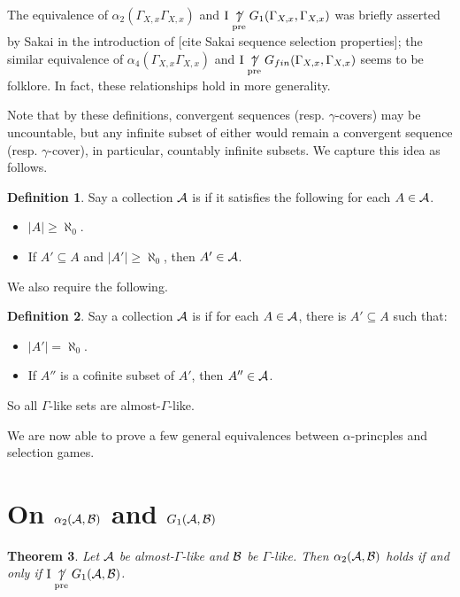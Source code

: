 \documentclass{amsart}
\theoremstyle{plain}
\newtheorem{theorem}{Theorem}
\theoremstyle{definition}
\newtheorem{definition}[theorem]{Definition}
\theoremstyle{remark}
\theoremstyle{plain}
\theoremstyle{definition}
\theoremstyle{remark}
\begin{document}
The equivalence of \(\alpha_2(\Gamma_{X,x}\Gamma_{X,x})\) and 
\(\mathrm{I}\underset{\text{pre}}{\not\uparrow} G_1(\Gamma_{X,x},\Gamma_{X,x})\) was briefly asserted by Sakai
in the introduction of [cite Sakai sequence selection properties]; the similar
equivalence of \(\alpha_4(\Gamma_{X,x}\Gamma_{X,x})\) and 
\(\mathrm{I}\underset{\text{pre}}{\not\uparrow} G_{fin}(\Gamma_{X,x},\Gamma_{X,x})\) seems to be folklore.
In fact, these relationships hold in more generality.

Note that by these definitions, convergent sequences (resp. \(\gamma\)-covers) may be uncountable,
but any infinite subset of either would remain a convergent sequence (resp. \(\gamma\)-cover),
in particular, countably infinite subsets. We capture this idea as follows.

\begin{definition}
Say a collection \(\mathcal{A}\) is  if it satisfies the following
for each \(A\in\mathcal{A}\).
\begin{itemize}
\item \(|A|\geq\aleph_0\).
\item If \(A'\subseteq A\) and \(|A'|\geq\aleph_0\), then \(A'\in\mathcal{A}\).
\end{itemize}
\end{definition}

We also require the following.

\begin{definition}
Say a collection \(\mathcal{A}\) is  if
for each \(A\in\mathcal{A}\), there is \(A'\subseteq A\) such that:
\begin{itemize}
\item \(|A'|=\aleph_0\).
\item If \(A''\) is a cofinite subset of \(A'\), then \(A''\in\mathcal{A}\).
\end{itemize}
\end{definition}

So all \(\Gamma\)-like sets are almost-\(\Gamma\)-like.

We are now able to prove a few general equivalences between \(\alpha\)-princples
and selection games.

\section{On \(\alpha_2(\mathcal{A},\mathcal{B})\) and \(G_1(\mathcal{A},\mathcal{B})\)}

\begin{theorem}
Let \(\mathcal{A}\) be almost-\(\Gamma\)-like and \(\mathcal{B}\) be \(\Gamma\)-like. 
Then \(\alpha_2(\mathcal{A},\mathcal{B})\) holds if and only
if \(\mathrm{I}\underset{\text{pre}}{\not\uparrow} G_1(\mathcal{A},\mathcal{B})\).
\end{theorem}
\end{document}
